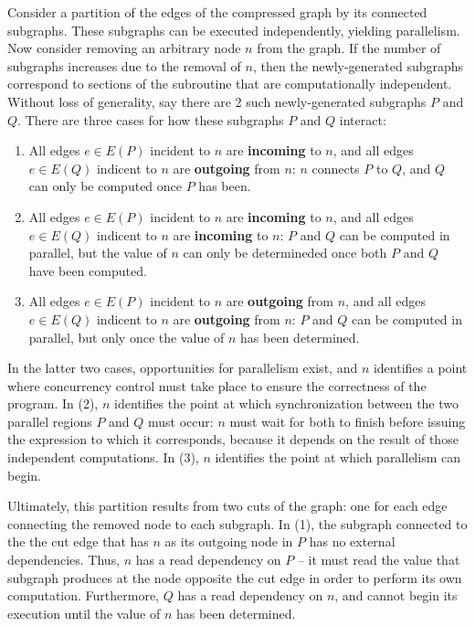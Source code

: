 Consider a partition of the edges of the compressed graph by its connected
subgraphs. These subgraphs can be executed independently, yielding parallelism.
Now consider removing an arbitrary node $n$ from the graph. If the number of
subgraphs increases due to the removal of $n$, then the newly-generated
subgraphs correspond to sections of the subroutine that are computationally
independent. Without loss of generality, say there are 2 such newly-generated
subgraphs $P$ and $Q$. There are three cases for how these subgraphs $P$ and $Q$
interact:
\begin{enumerate}
    \item All edges $e \in E(P)$ incident to $n$ are \textbf{incoming} to $n$,
        and all edges $e \in E(Q)$ indicent to $n$ are \textbf{outgoing} from
        $n$: $n$ connects $P$ to $Q$, and $Q$ can only be computed once $P$ has
        been.
    \item All edges $e \in E(P)$ incident to $n$ are \textbf{incoming} to $n$,
        and all edges $e \in E(Q)$ indicent to $n$ are \textbf{incoming} to $n$:
        $P$ and $Q$ can be computed in parallel, but the value of $n$ can only
        be determineded once both $P$ and $Q$ have been computed.
    \item All edges $e \in E(P)$ incident to $n$ are \textbf{outgoing} from $n$,
        and all edges $e \in E(Q)$ indicent to $n$ are \textbf{outgoing} from
        $n$: $P$ and $Q$ can be computed in parallel, but only once the value of
        $n$ has been determined.
\end{enumerate}

In the latter two cases, opportunities for parallelism exist, and $n$ identifies
a point where concurrency control must take place to ensure the correctness of
the program. In (2), $n$ identifies the point at which synchronization between
the two parallel regions $P$ and $Q$ must occur: $n$ must wait for both to
finish before issuing the expression to which it corresponds, because it depends
on the result of those independent computations. In (3), $n$ identifies the
point at which parallelism can begin.

Ultimately, this partition results from two cuts of the graph: one for each edge
connecting the removed node to each subgraph. In (1), the subgraph connected to
the the cut edge that has $n$ as its outgoing node in $P$ has no external
dependencies. Thus, $n$ has a read dependency on $P$ -- it must read the value
that subgraph produces at the node opposite the cut edge in order to perform its
own computation. Furthermore, $Q$ has a read dependency on $n$, and cannot begin
its execution until the value of $n$ has been determined.


